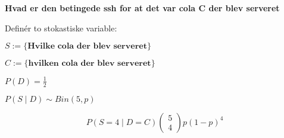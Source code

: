 \textbf{Hvad er den betingede ssh for at det var cola C der blev serveret}

Definér to stokastiske variable:

$S := \{\textbf{Hvilke cola der blev serveret}\}$

$C:= \{\textbf{hvilken cola der blev serveret}\}$

$P(D) =  \frac{1}{2}$

$P(S\mid D) \sim Bin(5,p)$

\begin{equation}
    P(S = 4\mid D=C)\begin{pmatrix} 5 \\ 4\end{pmatrix} p (1-p)^4
\end{equation}
